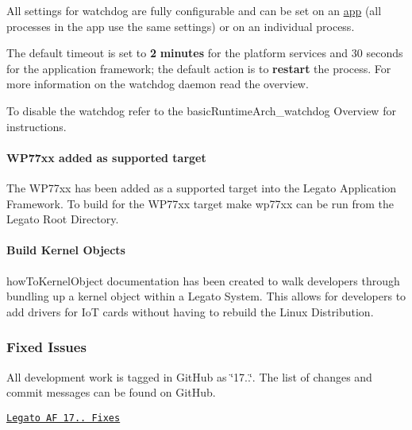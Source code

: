 All settings for watchdog are fully configurable and can be set on an \hyperlink{defFilesAdef_defFilesAdef_watchdogAction}{app} (all processes in the app use the same settings) or on an individual process.

The default timeout is set to {\bfseries 2} {\bfseries minutes} for the platform services and 30 seconds for the application framework; the default action is to {\bfseries restart} the process. For more information on the watchdog daemon read the overview.

To disable the watchdog refer to the basic\+Runtime\+Arch\+\_\+watchdog Overview for instructions.\hypertarget{releaseNotes17100_rn1710_Features_wp77xx}{}\paragraph{W\+P77xx added as supported target}\label{releaseNotes17100_rn1710_Features_wp77xx}
The W\+P77xx has been added as a supported target into the Legato Application Framework. To build for the W\+P77xx target {\ttfamily make} {\ttfamily wp77xx} can be run from the Legato Root Directory.\hypertarget{releaseNotes17100_rn1710_Features_HowTo}{}\paragraph{Build Kernel Objects}\label{releaseNotes17100_rn1710_Features_HowTo}
how\+To\+Kernel\+Object documentation has been created to walk developers through bundling up a kernel object within a Legato System. This allows for developers to add drivers for IoT cards without having to rebuild the Linux Distribution.\hypertarget{releaseNotes17100_rn1710_Fixes}{}\subsubsection{Fixed Issues}\label{releaseNotes17100_rn1710_Fixes}
All development work is tagged in Git\+Hub as \char`\"{}17..\char`\"{}. The list of changes and commit messages can be found on Git\+Hub.


\begin{DoxyItemize}
\item \href{https://github.com/legatoproject/legato-af/commits/17.10.0}{\tt Legato AF 17.. Fixes}
\end{DoxyItemize}

